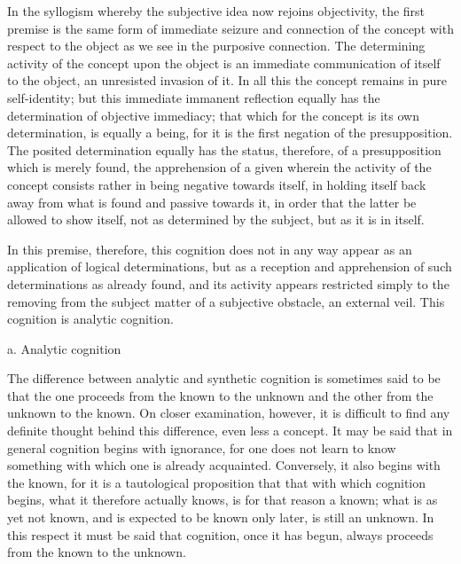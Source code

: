 In the syllogism whereby
the subjective idea now rejoins objectivity,
the first premise is the same form of
immediate seizure and connection of the concept
with respect to the object as
we see in the purposive connection.
The determining activity of the concept
upon the object is an immediate communication of
itself to the object, an unresisted invasion of it.
In all this the concept remains in pure self-identity;
but this immediate immanent reflection equally has
the determination of objective immediacy;
that which for the concept is its own determination,
is equally a being, for it is
the first negation of the presupposition.
The posited determination equally has the status,
therefore, of a presupposition which is merely found,
the apprehension of a given wherein the activity of
the concept consists rather in being negative towards itself,
in holding itself back away from what is found
and passive towards it,
in order that the latter be allowed to show itself,
not as determined by the subject,
but as it is in itself.

In this premise, therefore,
this cognition does not in any way appear as
an application of logical determinations,
but as a reception and apprehension
of such determinations as already found,
and its activity appears restricted
simply to the removing from
the subject matter of a subjective obstacle,
an external veil.
This cognition is analytic cognition.

a. Analytic cognition

The difference between analytic and synthetic cognition is
sometimes said to be that the one proceeds
from the known to the unknown
and the other from the unknown to the known.
On closer examination, however, it is difficult to
find any definite thought behind this difference,
even less a concept.
It may be said that in general
cognition begins with ignorance,
for one does not learn to know something
with which one is already acquainted.
Conversely, it also begins with the known,
for it is a tautological proposition that
that with which cognition begins,
what it therefore actually knows,
is for that reason a known;
what is as yet not known,
and is expected to be known only later,
is still an unknown.
In this respect it must be said that cognition,
once it has begun, always proceeds
from the known to the unknown.

